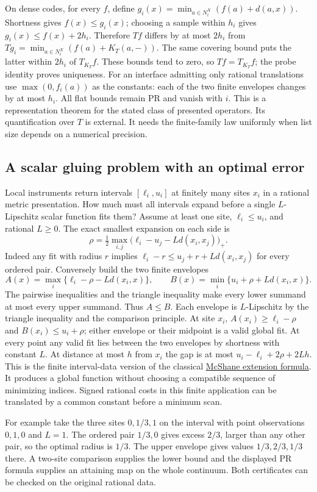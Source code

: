 On dense codes, for every \(f\), define \(g_i(x)=\min_{a\in N_i^X}(f(a)+d(a,x))\). Shortness gives \(f(x)\le g_i(x)\); choosing a sample within \(h_i\) gives \(g_i(x)\le f(x)+2h_i\). Therefore \(Tf\) differs by at most \(2h_i\) from \(Tg_i=\min_{a\in N_i^X}(f(a)+K_T(a,-))\). The same covering bound puts the latter within \(2h_i\) of \(T_{K_T}f\). These bounds tend to zero, so \(Tf=T_{K_T}f\); the probe identity proves uniqueness. For an interface admitting only rational translations use \(\max(0,f_i(a))\) as the constants: each of the two finite envelopes changes by at most \(h_i\). All flat bounds remain PR and vanish with \(i\). This is a representation theorem for the stated class of presented operators. Its quantification over \(T\) is external. It needs the finite-family law uniformly when list size depends on a numerical precision.

\subsection{A scalar gluing problem with an optimal error}

Local instruments return intervals \([\ell_i,u_i]\) at finitely many sites \(x_i\) in a rational metric presentation. How much must all intervals expand before a single \(L\)-Lipschitz scalar function fits them? Assume at least one site, \(\ell_i\le u_i\), and rational \(L\ge0\). The exact smallest expansion on each side is
\begin{equation}
 \rho=\tfrac12\max_{i,j}\big(\ell_i-u_j-Ld(x_i,x_j)\big)_+ .
 \label{eq:glue}
\end{equation}
Indeed any fit with radius \(r\) implies \(\ell_i-r\le u_j+r+Ld(x_i,x_j)\) for every ordered pair. Conversely build the two finite envelopes
\[
 A(x)=\max_i\{\ell_i-\rho-Ld(x_i,x)\},\qquad
 B(x)=\min_i\{u_i+\rho+Ld(x_i,x)\}.
\]
The pairwise inequalities and the triangle inequality make every lower summand at most every upper summand. Thus \(A\le B\). Each envelope is \(L\)-Lipschitz by the triangle inequality and the comparison principle. At site \(x_i\), \(A(x_i)\ge\ell_i-\rho\) and \(B(x_i)\le u_i+\rho\); either envelope or their midpoint is a valid global fit. At every point any valid fit lies between the two envelopes by shortness with constant \(L\). At distance at most \(h\) from \(x_i\) the gap is at most \(u_i-\ell_i+2\rho+2Lh\). This is the finite interval-data version of the classical \href{https://doi.org/10.1090/S0002-9904-1934-05978-0}{McShane extension formula}. It produces a global function without choosing a compatible sequence of minimizing indices. Signed rational costs in this finite application can be translated by a common constant before a minimum scan.

For example take the three sites \(0,1/3,1\) on the interval with point observations \(0,1,0\) and \(L=1\). The ordered pair \(1/3,0\) gives excess \(2/3\), larger than any other pair, so the optimal radius is \(1/3\). The upper envelope gives values \(1/3,2/3,1/3\) there. A two-site comparison supplies the lower bound and the displayed PR formula supplies an attaining map on the whole continuum. Both certificates can be checked on the original rational data.
